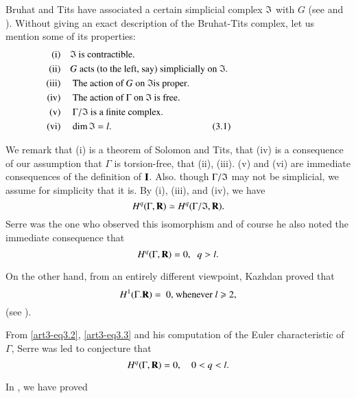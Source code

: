 Bruhat and Tits have associated a certain simplicial complex $\mathfrak{I}$ with $G$ (see \cite{art-key2} and \cite{art-key3}). Without giving an exact description of the Bruhat-Tits complex, let us mention some of its properties:
\begin{align*}
\text{(i)} &\quad \fI \text{ is contractible.} \hspace{3cm}\\
\text{(ii)} &\quad G \text{ acts (to the left, say) simplicially on } \fI.  \hspace{3cm}\\
\text{(iii)} &\quad \text{ The action of } G \text{ on } \fI \text{is proper}.  \hspace{3cm}\\
\text{(iv)} &\quad \text{ The action of $\Gamma$ on $\fI$ is free.}  \hspace{3cm}\\
\text{(v)} &\quad \text{ $\Gamma/\fI$ is a finite complex.}  \hspace{3cm}\\
\text{(vi)} &\quad \text{ $\dim \fI = l$.}  \hspace{3cm} \tag{3.1}
\end{align*}

We remark that (i) is a theorem of Solomon and Tits, that (iv) is a consequence of our assumption that $\Gamma$ is torsion-free, that (ii), (iii). (v) and (vi) are immediate consequences of the definition of $\mathbf{I}$. Also. though $\Gamma/\mathfrak{I}$ may not be simplicial, we assume for simplicity that it is. By (i), (iii), and (iv), we have
$$
H^q (\Gamma, \mathbf{R}) \simeq H^q (\Gamma/\mathfrak{I}, \mathbf{R}).
$$
Serre was the one who observed this isomorphism and of course he also noted the immediate consequence that 
\begin{equation}
H^q (\Gamma, \mathbf{R}) = 0, \;\; q>l. \label{art3-eq3.2}
\end{equation}

On the other hand, from an entirely different viewpoint, Kazhdan proved that
\begin{equation}
H^1 (\Gamma. \mathbf{R}) = \text{ 0, whenever $l \geqslant 2$,}
\label{art3-eq3.3}
\end{equation}
(see \cite{art3-key5}).

From \eqref{art3-eq3.2}, \eqref{art3-eq3.3} and his computation of the Euler characteristic of $\Gamma$, Serre was led to conjecture that 
$$
H^q (\Gamma, \mathbf{R}) = 0, \quad 0 < q < l.
$$

In \cite{art3-key7}, we have proved

